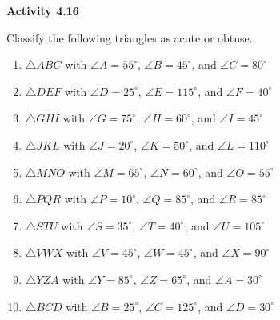 \vspace{0.3ex}
\noindent\textbf{Activity 4.16}

\vspace{0.2ex}

Classify the following triangles as acute or obtuse.

\begin{enumerate}
    \item \(\triangle ABC\) with \(\angle A = 55^\circ\), \(\angle B = 45^\circ\), and \(\angle C = 80^\circ\)
    \item \(\triangle DEF\) with \(\angle D = 25^\circ\), \(\angle E = 115^\circ\), and \(\angle F = 40^\circ\)
    \item \(\triangle GHI\) with \(\angle G = 75^\circ\), \(\angle H = 60^\circ\), and \(\angle I = 45^\circ\)
    \item \(\triangle JKL\) with \(\angle J = 20^\circ\), \(\angle K = 50^\circ\), and \(\angle L = 110^\circ\)
    \item \(\triangle MNO\) with \(\angle M = 65^\circ\), \(\angle N = 60^\circ\), and \(\angle O = 55^\circ\)
    \item \(\triangle PQR\) with \(\angle P = 10^\circ\), \(\angle Q = 85^\circ\), and \(\angle R = 85^\circ\)
    \item \(\triangle STU\) with \(\angle S = 35^\circ\), \(\angle T = 40^\circ\), and \(\angle U = 105^\circ\)
    \item \(\triangle VWX\) with \(\angle V = 45^\circ\), \(\angle W = 45^\circ\), and \(\angle X = 90^\circ\)
    \item \(\triangle YZA\) with \(\angle Y = 85^\circ\), \(\angle Z = 65^\circ\), and \(\angle A = 30^\circ\)
    \item \(\triangle BCD\) with \(\angle B = 25^\circ\), \(\angle C = 125^\circ\), and \(\angle D = 30^\circ\)
\end{enumerate}
